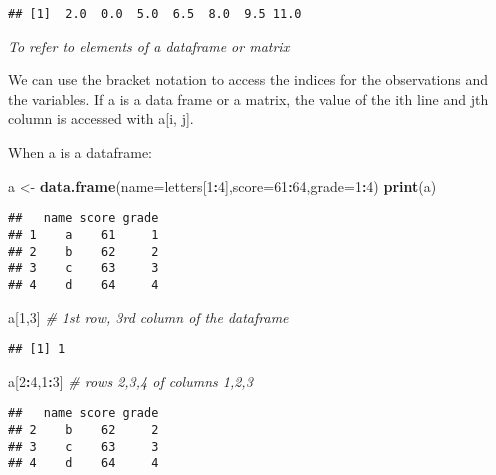 \documentclass[]{book}
\newenvironment{Shaded}{\begin{snugshade}}{\end{snugshade}}
\newcommand{\KeywordTok}[1]{\textcolor[rgb]{0.13,0.29,0.53}{\textbf{#1}}}
\newcommand{\DataTypeTok}[1]{\textcolor[rgb]{0.13,0.29,0.53}{#1}}
\newcommand{\DecValTok}[1]{\textcolor[rgb]{0.00,0.00,0.81}{#1}}
\newcommand{\StringTok}[1]{\textcolor[rgb]{0.31,0.60,0.02}{#1}}
\newcommand{\CommentTok}[1]{\textcolor[rgb]{0.56,0.35,0.01}{\textit{#1}}}
\newcommand{\OperatorTok}[1]{\textcolor[rgb]{0.81,0.36,0.00}{\textbf{#1}}}
\newcommand{\NormalTok}[1]{#1}
\theoremstyle{definition}
\theoremstyle{definition}
\theoremstyle{definition}
\theoremstyle{remark}
\begin{document}
\begin{verbatim}
## [1]  2.0  0.0  5.0  6.5  8.0  9.5 11.0
\end{verbatim}

\emph{To refer to elements of a dataframe or matrix}

We can use the bracket notation to access the indices for the
observations and the variables. If a is a data frame or a matrix, the
value of the ith line and jth column is accessed with a{[}i, j{]}.

When a is a dataframe:

\begin{Shaded}
\begin{Highlighting}[]
\NormalTok{a <-}\StringTok{ }\KeywordTok{data.frame}\NormalTok{(}\DataTypeTok{name=}\NormalTok{letters[}\DecValTok{1}\OperatorTok{:}\DecValTok{4}\NormalTok{],}\DataTypeTok{score=}\DecValTok{61}\OperatorTok{:}\DecValTok{64}\NormalTok{,}\DataTypeTok{grade=}\DecValTok{1}\OperatorTok{:}\DecValTok{4}\NormalTok{)}
\KeywordTok{print}\NormalTok{(a)}
\end{Highlighting}
\end{Shaded}

\begin{verbatim}
##   name score grade
## 1    a    61     1
## 2    b    62     2
## 3    c    63     3
## 4    d    64     4
\end{verbatim}

\begin{Shaded}
\begin{Highlighting}[]
\NormalTok{a[}\DecValTok{1}\NormalTok{,}\DecValTok{3}\NormalTok{] }\CommentTok{# 1st row, 3rd column of the dataframe}
\end{Highlighting}
\end{Shaded}

\begin{verbatim}
## [1] 1
\end{verbatim}

\begin{Shaded}
\begin{Highlighting}[]
\NormalTok{a[}\DecValTok{2}\OperatorTok{:}\DecValTok{4}\NormalTok{,}\DecValTok{1}\OperatorTok{:}\DecValTok{3}\NormalTok{] }\CommentTok{# rows 2,3,4 of columns 1,2,3}
\end{Highlighting}
\end{Shaded}

\begin{verbatim}
##   name score grade
## 2    b    62     2
## 3    c    63     3
## 4    d    64     4
\end{verbatim}
\end{document}
